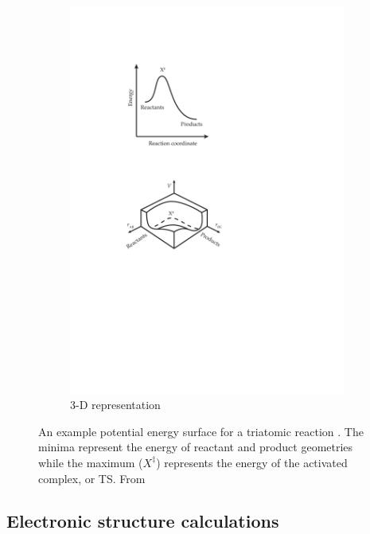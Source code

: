 \documentclass[preprint, 11pt]{elsarticle} %
\begin{document}
\begin{figure}[htbp]
\begin{subfigure}[t]{.5\textwidth}
  \includegraphics{TST-3D-PES}
  \caption{3-D representation}
  \label{fig:sub2}
\end{subfigure}
\caption{An example potential energy surface for a triatomic reaction  . The minima represent the energy of reactant and product geometries while the maximum ($X^\ddagger$) represents the energy of the activated complex, or TS. From \cite{West:2020:TSTfigures}}
\label{fig:pes}
\end{figure}

\subsection{Electronic structure calculations}
\end{document}
